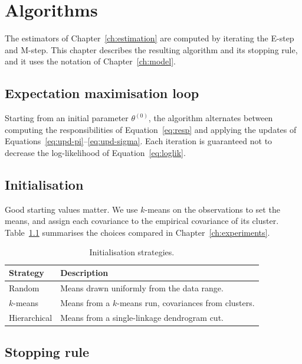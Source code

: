 \chapter{Algorithms}\label{ch:algorithms}

The estimators of Chapter~\ref{ch:estimation} are computed by iterating the
E-step and M-step. This chapter describes the resulting algorithm and its
stopping rule, and it uses the notation of Chapter~\ref{ch:model}.

\section{Expectation maximisation loop}\label{sec:em}

Starting from an initial parameter $\theta^{(0)}$, the algorithm alternates
between computing the responsibilities of Equation~\eqref{eq:resp} and applying
the updates of Equations~\eqref{eq:upd-pi}--\eqref{eq:upd-sigma}. Each
iteration is guaranteed not to decrease the log-likelihood of
Equation~\eqref{eq:loglik}.

\lipsum[27-28]

\section{Initialisation}\label{sec:init}

Good starting values matter. We use $k$-means on the observations to set the
means, and assign each covariance to the empirical covariance of its cluster.
Table~\ref{tab:init} summarises the choices compared in
Chapter~\ref{ch:experiments}.

\begin{table}[ht]
  \centering
  \begin{tabular}{lp{6cm}}
    \toprule
    Strategy & Description \\
    \midrule
    Random & Means drawn uniformly from the data range. \\
    $k$-means & Means from a $k$-means run, covariances from clusters. \\
    Hierarchical & Means from a single-linkage dendrogram cut. \\
    \bottomrule
  \end{tabular}
  \caption{Initialisation strategies.}\label{tab:init}
\end{table}

\lipsum[29-30]

\section{Stopping rule}\label{sec:stopping}


